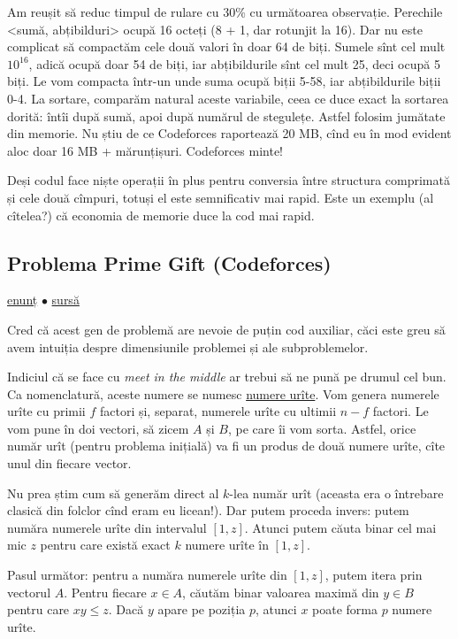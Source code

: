 \documentclass[../main.tex]{subfiles}
\begin{document}
Am reușit să reduc timpul de rulare cu 30\% cu următoarea observație. Perechile <sumă, abțibilduri> ocupă 16 octeți (8 + 1, dar rotunjit la 16). Dar nu este complicat să compactăm cele două valori în doar 64 de biți. Sumele sînt cel mult $10^{16}$, adică ocupă doar 54 de biți, iar abțibildurile sînt cel mult 25, deci ocupă 5 biți. Le vom compacta într-un  unde suma ocupă biții 5-58, iar abțibildurile biții 0-4. La sortare, comparăm natural aceste variabile, ceea ce duce exact la sortarea dorită: întîi după sumă, apoi după numărul de stegulețe. Astfel folosim jumătate din memorie. Nu știu de ce Codeforces raportează 20 MB, cînd eu în mod evident aloc doar 16 MB + mărunțișuri. Codeforces minte! 

Deși codul face niște operații în plus pentru conversia între structura comprimată și cele două cîmpuri, totuși el este semnificativ mai rapid. Este un exemplu (al cîtelea?) că economia de memorie duce la cod mai rapid.


\subsection{Problema Prime Gift (Codeforces)}
\label{problem:prime-gift}

\href{https://codeforces.com/contest/912/problem/E}{enunț}
$\bullet$
\hyperref[code:prime-gift]{sursă}

Cred că acest gen de problemă are nevoie de puțin cod auxiliar, căci este greu să avem intuiția despre dimensiunile problemei și ale subproblemelor.

Indiciul că se face cu \textit{meet in the middle} ar trebui să ne pună pe drumul cel bun. Ca nomenclatură, aceste numere se numesc \href{https://leetcode.com/problems/ugly-number/description/}{numere urîte}. Vom genera numerele urîte cu primii $f$ factori și, separat, numerele urîte cu ultimii $n - f$ factori. Le vom pune în doi vectori, să zicem $A$ și $B$, pe care îi vom sorta. Astfel, orice număr urît (pentru problema inițială) va fi un produs de două numere urîte, cîte unul din fiecare vector.

Nu prea știm cum să generăm direct al $k$-lea număr urît (aceasta era o întrebare clasică din folclor cînd eram eu licean!). Dar putem proceda invers: putem număra numerele urîte din intervalul $[1,z]$. Atunci putem căuta binar cel mai mic $z$ pentru care există exact $k$ numere urîte în $[1,z]$.

Pasul următor: pentru a număra numerele urîte din $[1,z]$, putem itera prin vectorul $A$. Pentru fiecare  $x \in A$, căutăm binar valoarea maximă din $y \in B$ pentru care $xy \leq z$. Dacă  $y$ apare pe poziția $p$, atunci $x$ poate forma $p$ numere urîte.
\end{document}
